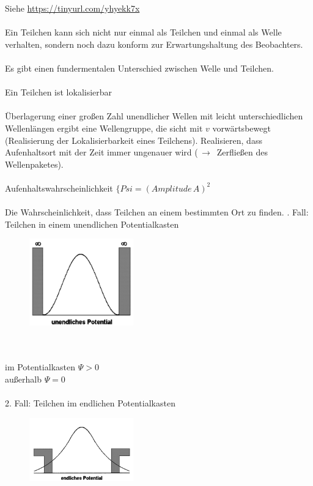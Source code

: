 Siehe \url{https://tinyurl.com/yhyekk7x}
\\
\\
Ein Teilchen kann sich nicht nur einmal als Teilchen und einmal als Welle verhalten, sondern noch dazu konform zur Erwartungshaltung des Beobachters.
\\
\\
Es gibt einen fundermentalen Unterschied zwischen Welle und Teilchen.
\\
\\
{ \color{red} Ein Teilchen ist lokalisierbar}
\\
\\
Überlagerung einer großen Zahl unendlicher Wellen mit leicht unterschiedlichen Wellenlängen ergibt eine Wellengruppe, die sicht mit $v$
vorwärtsbewegt (Realisierung der Lokalisierbarkeit eines Teilchens). Realisieren, dass Aufenhaltsort mit der Zeit immer ungenauer wird
($\,\to\,$ Zerfließen des Wellenpaketes).
\\
\\
Aufenhaltswahrscheinlichkeit \mbox{\Large $ \{Psi = (Amplitude\,A)^2$}
\\
\\
Die Wahrscheinlichkeit, dass Teilchen an einem bestimmten Ort zu finden.
. Fall: Teilchen in einem unendlichen Potentialkasten
    \begin{figure}[h]
        \includegraphics[width=0.4\textwidth]{media/unendlichesPotential.png}
        \label{fig:meine-grafik}
    \end{figure}
\\
\\
im Potentialkasten \mbox{\Large $\Psi > 0$}
\\
außerhalb \mbox{\Large $\Psi = 0$}
\\
\\
2. Fall: Teilchen im endlichen Potentialkasten
\\
    \begin{figure}[h]
        \includegraphics[width=0.4\textwidth]{media/endlichesPotential.png}
        \label{fig:meine-grafik}
    \end{figure}
